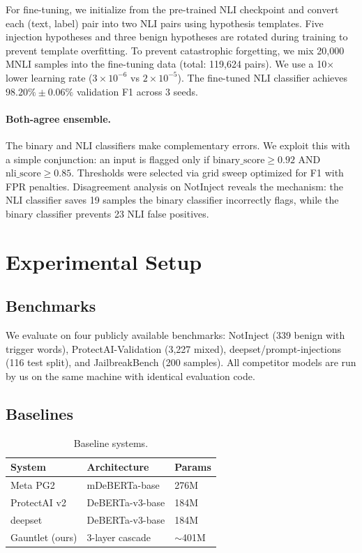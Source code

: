 \documentclass[11pt]{article}
\begin{document}
For fine-tuning, we initialize from the pre-trained NLI checkpoint and convert each (text, label) pair into two NLI pairs using hypothesis templates. Five injection hypotheses and three benign hypotheses are rotated during training to prevent template overfitting. To prevent catastrophic forgetting, we mix 20,000 MNLI samples into the fine-tuning data (total: 119,624 pairs). We use a 10$\times$ lower learning rate ($3 \times 10^{-6}$ vs $2 \times 10^{-5}$). The fine-tuned NLI classifier achieves $98.20\% \pm 0.06\%$ validation F1 across 3 seeds.

\paragraph{Both-agree ensemble.} The binary and NLI classifiers make complementary errors. We exploit this with a simple conjunction: an input is flagged only if $\text{binary\_score} \geq 0.92$ AND $\text{nli\_score} \geq 0.85$. Thresholds were selected via grid sweep optimized for F1 with FPR penalties. Disagreement analysis on NotInject reveals the mechanism: the NLI classifier saves 19 samples the binary classifier incorrectly flags, while the binary classifier prevents 23 NLI false positives.

\section{Experimental Setup}

\subsection{Benchmarks}

We evaluate on four publicly available benchmarks: NotInject \cite{lee2025injecguard} (339 benign with trigger words), ProtectAI-Validation (3,227 mixed), deepset/prompt-injections (116 test split), and JailbreakBench \cite{chao2024jailbreakbench} (200 samples). All competitor models are run by us on the same machine with identical evaluation code.

\subsection{Baselines}

\begin{table}[h]
\centering
\small
\begin{tabular}{lll}
\toprule
\textbf{System} & \textbf{Architecture} & \textbf{Params} \\
\midrule
Meta PG2 & mDeBERTa-base & 276M \\
ProtectAI v2 & DeBERTa-v3-base & 184M \\
deepset & DeBERTa-v3-base & 184M \\
Gauntlet (ours) & 3-layer cascade & $\sim$401M \\
\bottomrule
\end{tabular}
\caption{Baseline systems.}
\end{table}
\end{document}
